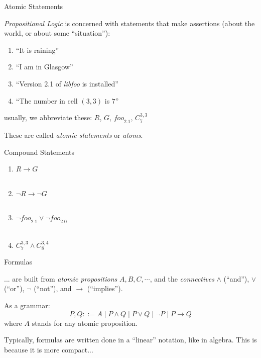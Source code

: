 \documentclass[xetex,aspectratio=169,14pt,hyperref={pdfpagelabels=true,pdflang={en-GB}}]{beamer}
\begin{document}
\frame{\titlepage}


\begin{frame}
  {Atomic Statements}

  \emph{Propositional Logic} is concerned with statements that make
  assertions (about the world, or about some ``situation''):
  \begin{enumerate}
  \item ``It is raining''
  \item ``I am in Glasgow''
  \item ``Version 2.1 of \emph{libfoo} is installed''
  \item ``The number in cell $(3,3)$ is $7$''
  \end{enumerate}
  usually, we abbreviate these: $R$, $G$, $\mathit{foo}_{2.1}$, $C^{3,3}_7$

  \medskip

  These are called \emph{atomic statements} or \emph{atoms}.
\end{frame}

\begin{frame}
  {Compound Statements}

  \begin{enumerate}
  \item $R \to G$ \\  \\
    \medskip
  \item $\lnot R \to \lnot G$ \\  \\
    \medskip
  \item $\lnot\mathit{foo}_{2.1} \lor \lnot\mathit{foo}_{2.0}$\\
     \\
    \medskip
  \item $C^{3,3}_7 \land C^{3,4}_8$\\
  \end{enumerate}
\end{frame}

\begin{frame}
  {Formulas}

  ... are built from \emph{atomic propositions} $A, B, C, \cdots$, and
  the \emph{connectives} $\land$ (``and''), $\lor$ (``or''), $\lnot$
  (``not''), and $\to$ (``implies'').

  \medskip

  As a grammar:
  \begin{displaymath}
    P, Q ::= A \mid P \land Q \mid P \lor Q \mid \lnot P \mid P \to Q
  \end{displaymath}
  where $A$ stands for any atomic proposition.

  \bigskip

  Typically, formulas are written done in a ``linear'' notation, like
  in algebra. This is because it is more compact...

\end{frame}
\end{document}
